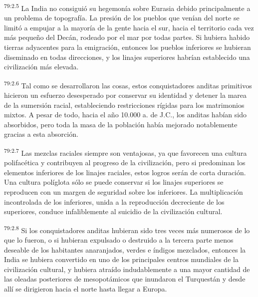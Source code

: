 \par
\textsuperscript{79:2.5} La India no consiguió su hegemonía sobre Eurasia debido principalmente a un problema de topografía. La presión de los pueblos que venían del norte se limitó a empujar a la mayoría de la gente hacia el sur, hacia el territorio cada vez más pequeño del Decán, rodeado por el mar por todas partes. Si hubiera habido tierras adyacentes para la emigración, entonces los pueblos inferiores se hubieran diseminado en todas direcciones, y los linajes superiores habrían establecido una civilización más elevada.

\par
\textsuperscript{79:2.6} Tal como se desarrollaron las cosas, estos conquistadores anditas primitivos hicieron un esfuerzo desesperado por conservar su identidad y detener la marea de la sumersión racial, estableciendo restricciones rígidas para los matrimonios mixtos. A pesar de todo, hacia el año 10.000 a. de J.C., los anditas habían sido absorbidos, pero toda la masa de la población había mejorado notablemente gracias a esta absorción.

\par
\textsuperscript{79:2.7} Las mezclas raciales siempre son ventajosas, ya que favorecen una cultura polifacética y contribuyen al progreso de la civilización, pero si predominan los elementos inferiores de los linajes raciales, estos logros serán de corta duración. Una cultura políglota sólo se puede conservar si los linajes superiores se reproducen con un margen de seguridad sobre los inferiores. La multiplicación incontrolada de los inferiores, unida a la reproducción decreciente de los superiores, conduce infaliblemente al suicidio de la civilización cultural.

\par
\textsuperscript{79:2.8} Si los conquistadores anditas hubieran sido tres veces más numerosos de lo que lo fueron, o si hubieran expulsado o destruido a la tercera parte menos deseable de los habitantes anaranjados, verdes e índigos mezclados, entonces la India se hubiera convertido en uno de los principales centros mundiales de la civilización cultural, y hubiera atraído indudablemente a una mayor cantidad de las oleadas posteriores de mesopotámicos que inundaron el Turquestán y desde allí se dirigieron hacia el norte hasta llegar a Europa.

